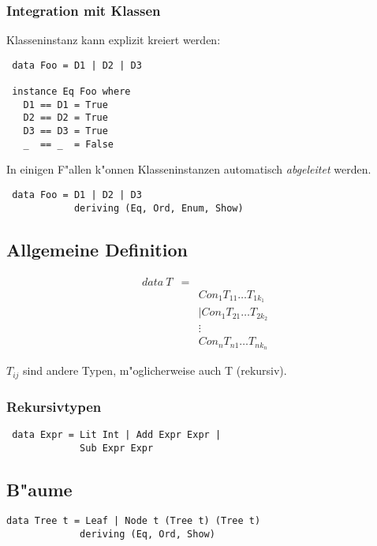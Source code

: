\documentclass[german,10pt, a4paper, twocolumn]{scrartcl}
\theoremstyle{definition}
\theoremstyle{remark}
\begin{document}
\subsubsection{Integration mit Klassen}

Klasseninstanz kann explizit kreiert werden:
\small
\begin{verbatim}
 data Foo = D1 | D2 | D3

 instance Eq Foo where
   D1 == D1 = True
   D2 == D2 = True
   D3 == D3 = True
   _  == _  = False
\end{verbatim}
\normalsize

In einigen F"allen k"onnen Klasseninstanzen automatisch \textit{abgeleitet} werden.
\small
\begin{verbatim}
 data Foo = D1 | D2 | D3
            deriving (Eq, Ord, Enum, Show)
\end{verbatim}
\normalsize

\subsection{Allgemeine Definition}

\begin{eqnarray}
	data\ T&	= &	\nonumber\\
	&		&	Con_1 T_{11} \ldots T_{1k_1}\nonumber\\
	&		&	|Con_1 T_{21} \ldots T_{2k_2}\nonumber\\
	&		&	\vdots\nonumber\\
	&		&	Con_n T_{n1} \ldots T_{nk_n}\nonumber
\end{eqnarray}

$T_{ij}$ sind andere Typen, m"oglicherweise auch T (rekursiv).\\

\subsubsection{Rekursivtypen}

\small
\begin{verbatim}
 data Expr = Lit Int | Add Expr Expr |
             Sub Expr Expr
\end{verbatim}
\normalsize

\subsection{B"aume}

\small
\begin{verbatim}
data Tree t = Leaf | Node t (Tree t) (Tree t)
             deriving (Eq, Ord, Show)
\end{verbatim}
\normalsize
\end{document}

